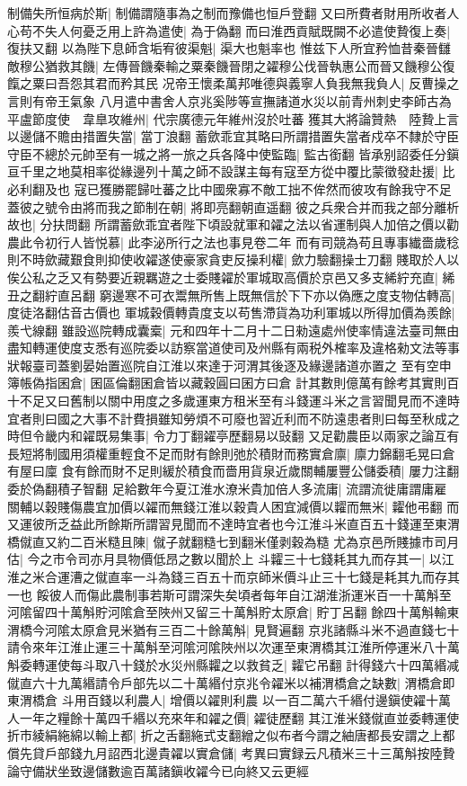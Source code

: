 制備失所恒病於斯|{
	制備謂隨事為之制而豫備也恒戶登翻}
又曰所費者財用所收者人心苟不失人何憂乏用上許為遣使|{
	為于偽翻}
而曰淮西貢賦既闕不必遣使贄復上奏|{
	復扶又翻}
以為陛下息師含垢宥彼渠魁|{
	渠大也魁率也}
惟兹下人所宜矜恤昔秦晉讎敵穆公猶救其饑|{
	左傳晉饑秦輸之粟秦饑晉閉之糴穆公伐晉執惠公而晉又饑穆公復餼之粟曰吾怨其君而矜其民}
况帝王懷柔萬邦唯德與義寧人負我無我負人|{
	反曹操之言則有帝王氣象}
八月遣中書舍人京兆奚陟等宣撫諸道水災以前青州刺史李師古為平盧節度使　韋臯攻維州|{
	代宗廣德元年維州沒於吐蕃}
獲其大將論贊熱　陸贄上言以邊儲不贍由措置失當|{
	當丁浪翻}
蓄歛乖宜其略曰所謂措置失當者戍卒不隸於守臣守臣不總於元帥至有一城之將一旅之兵各降中使監臨|{
	監古銜翻}
皆承别詔委任分鎭亘千里之地莫相率從緣邊列十萬之師不設謀主每有寇至方從中覆比蒙徵發赴援|{
	比必利翻及也}
寇已獲勝罷歸吐蕃之比中國衆寡不敵工拙不侔然而彼攻有餘我守不足蓋彼之號令由將而我之節制在朝|{
	將即亮翻朝直遥翻}
彼之兵衆合并而我之部分離析故也|{
	分扶問翻}
所謂蓄歛乖宜者陛下頃設就軍和糴之法以省運制與人加倍之價以勸農此令初行人皆悦慕|{
	此李泌所行之法也事見卷二年}
而有司競為苟且專事纎嗇歲稔則不時歛藏艱食則抑使收糴遂使豪家貪吏反操利權|{
	歛力驗翻操士刀翻}
賤取於人以俟公私之乏又有勢要近親羈遊之士委賤糴於軍城取高價於京邑又多支絺紵充直|{
	絺丑之翻紵直呂翻}
窮邊寒不可衣鬻無所售上既無信於下下亦以偽應之度支物估轉高|{
	度徒洛翻估音古價也}
軍城穀價轉貴度支以苟售滯貨為功利軍城以所得加價為羨餘|{
	羨弋線翻}
雖設巡院轉成囊槖|{
	元和四年十二月十二日勑遠處州使率情違法臺司無由盡知轉運使度支悉有巡院委以訪察當道使司及州縣有兩税外榷率及違格勑文法等事狀報臺司蓋劉晏始置巡院自江淮以來達于河渭其後逐及緣邊諸道亦置之}
至有空申簿帳偽指囷倉|{
	囷區倫翻囷倉皆以藏穀圓曰囷方曰倉}
計其數則億萬有餘考其實則百十不足又曰舊制以關中用度之多歲運東方租米至有斗錢運斗米之言習聞見而不達時宜者則曰國之大事不計費損雖知勞煩不可廢也習近利而不防遠患者則曰每至秋成之時但令畿内和糴既易集事|{
	令力丁翻糴亭歷翻易以䜴翻}
又足勸農臣以兩家之論互有長短將制國用須權重輕食不足而財有餘則弛於積財而務實倉廪|{
	廪力錦翻毛晃曰倉有屋曰廩}
食有餘而財不足則緩於積食而嗇用貨泉近歲關輔屢豐公儲委積|{
	屢力注翻委於偽翻積子智翻}
足給數年今夏江淮水潦米貴加倍人多流庸|{
	流謂流徙庸謂庸雇}
關輔以穀賤傷農宜加價以糴而無錢江淮以穀貴人困宜減價以糶而無米|{
	糶他弔翻}
而又運彼所乏益此所餘斯所謂習見聞而不達時宜者也今江淮斗米直百五十錢運至東渭橋僦直又約二百米糙且陳|{
	僦子就翻糙七到翻米僅剥穀為糙}
尤為京邑所賤據市司月估|{
	今之市令司亦月具物價低昂之數以聞於上}
斗糶三十七錢耗其九而存其一|{
	以江淮之米合運漕之僦直率一斗為錢三百五十而京師米價斗止三十七錢是耗其九而存其一也}
餒彼人而傷此農制事若斯可謂深失矣頃者每年自江湖淮浙運米百一十萬斛至河隂留四十萬斛貯河隂倉至陜州又留三十萬斛貯太原倉|{
	貯丁呂翻}
餘四十萬斛輸東渭橋今河隂太原倉見米猶有三百二十餘萬斛|{
	見賢遍翻}
京兆諸縣斗米不過直錢七十請令來年江淮止運三十萬斛至河隂河隂陜州以次運至東渭橋其江淮所停運米八十萬斛委轉運使每斗取八十錢於水災州縣糶之以救貧乏|{
	糶它吊翻}
計得錢六十四萬緡减僦直六十九萬緡請令戶部先以二十萬緡付京兆令糴米以補渭橋倉之缺數|{
	渭橋倉即東渭橋倉}
斗用百錢以利農人|{
	增價以糴則利農}
以一百二萬六千緡付邊鎭使糴十萬人一年之糧餘十萬四千緡以充來年和糴之價|{
	糴徒歷翻}
其江淮米錢僦直並委轉運使折市綾絹絁綿以輸上都|{
	折之舌翻絁式支翻繒之似布者今謂之紬唐都長安謂之上都}
償先貸戶部錢九月詔西北邊貴糴以實倉儲|{
	考異曰實録云凡積米三十三萬斛按陸贄論守備狀坐致邊儲數逾百萬諸鎭收糴今已向終又云更經}


